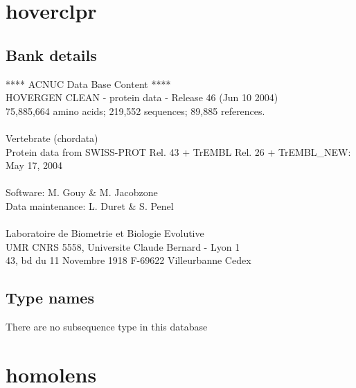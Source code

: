 \documentclass{article}
\begin{document}
\begin{Schunk}
\section{ hoverclpr }
\subsection{Bank details}
               ****     ACNUC Data Base Content      ****                       \\
          HOVERGEN CLEAN - protein data - Release 46 (Jun 10 2004)\\
          75,885,664 amino acids; 219,552 sequences; 89,885 references.\\
\\
                       Vertebrate (chordata)	  \\
Protein data from SWISS-PROT Rel. 43  + TrEMBL Rel. 26 + TrEMBL\_NEW: May 17, 2004\\
\\
Software: M. Gouy \& M. Jacobzone\\
Data maintenance: L. Duret \& S. Penel\\
\\
Laboratoire de Biometrie et Biologie Evolutive\\
UMR CNRS 5558, Universite Claude Bernard - Lyon 1 \\
43, bd du 11 Novembre 1918 F-69622 Villeurbanne Cedex\\


\subsection{Type names}
There are no subsequence type in this database
\section{ homolens }

\end{Schunk}
\end{document}
